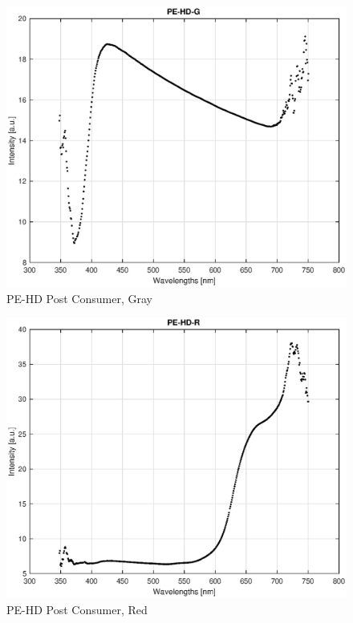 \begin{appendices}
\begin{figure}
    \centering
    \includegraphics[width = 12cm]{Images/appendix/pe-hd-postconsum-gray.eps}
    \caption{PE-HD Post Consumer, Gray}
    \label{fig:pehd-gray}
\end{figure}

\begin{figure}
    \centering
    \includegraphics[width = 12cm]{Images/appendix/pe-hd-postconsum-red.eps}
    \caption{PE-HD Post Consumer, Red}
    \label{fig:pehd-red}
\end{figure}


\end{appendices}
